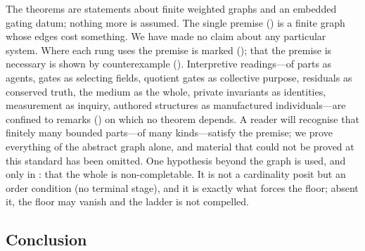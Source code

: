 The theorems are statements about finite weighted graphs and an embedded gating
datum; nothing more is assumed. The single premise () is a finite
graph whose edges cost something. We have made no claim about any particular
system. Where each rung uses the premise is marked (); that
the premise is necessary is shown by counterexample ().
Interpretive readings---of parts as agents, gates as selecting fields, quotient
gates as collective purpose, residuals as conserved truth, the medium as the
whole, private invariants as identities, measurement as inquiry, authored
structures as manufactured individuals---are confined to remarks
() on which no theorem depends. A reader
will recognise that finitely many bounded parts---of many kinds---satisfy the
premise; we prove everything of the abstract graph alone, and material that could
not be proved at this standard has been omitted. One hypothesis beyond the graph
is used, and only in : that the whole is non-completable. It is
not a cardinality posit but an order condition (no terminal stage), and it is
exactly what forces the floor; absent it, the floor may vanish and the ladder is
not compelled.

\subsection{Conclusion}

